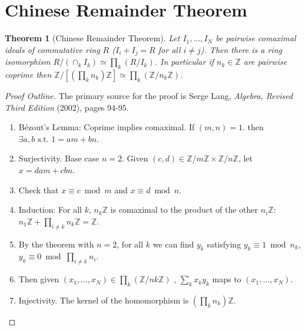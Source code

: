 \documentclass[12pt]{article}
\newtheorem*{theorem}{Theorem}
\begin{document}
\section{Chinese Remainder Theorem}

\begin{theorem}[Chinese Remainder Theorem]
  Let $I_1,\ldots,I_N$ be pairwise comaximal ideals of commutative
  ring $R$ ($I_i+I_j = R$ for all $i\ne j$). Then there is a ring
  isomorphism $R / (\cap_k I_k) \simeq \prod_k (R / I_k)$. In
  particular if $n_k \in \mathbb{Z}$ are pairwise coprime then
  $\mathbb{Z} / [(\prod_k n_k)\mathbb{Z}] \simeq \prod_k (\mathbb{Z} /
  n_k\mathbb{Z})$.
\end{theorem}

\begin{proof}[Proof Outline]
  The primary source for the proof is Serge Lang, \textit{Algebra,
    Revised Third Edition} (2002), pages 94-95.
  \begin{enumerate}
    \item Bézout’s Lemma: Coprime implies comaximal. If $(m,n) = 1$.
      then $\exists a,b \text{ s.t. } 1 = am + bn$.
    \item Surjectivity. Base case $n=2$. Given $(c,d) \in \mathbb{Z} /
      m\mathbb{Z} \times \mathbb{Z} / n\mathbb{Z}$, let $x =dam + cbn$.
    \item Check that $x \equiv c \bmod m$ and $x \equiv d \bmod n$.
    \item Induction: For all $k$, $n_k\mathbb{Z}$ is comaximal to the
      product of the other $n_i\mathbb{Z}$: $n_1\mathbb{Z} + \prod_{i
        \ne k}n_k\mathbb{Z} = \mathbb{Z}$.
    \item By the theorem with $n=2$, for all $k$ we can find $y_k$
      satisfying $y_k \equiv 1 \bmod n_k$, $y_k \equiv 0 \bmod \prod_{i\ne
        k}n_i$.
    \item Then given $(x_1,\ldots,x_N) \in \prod_k (\mathbb{Z} /
      nk\mathbb{Z})$ , $\sum_k x_ky_k$ maps to $(x_1,\ldots,x_N)$.
    \item Injectivity. The kernel of the homomorphism is
      $(\prod_k n_k)\mathbb{Z}$.
  \end{enumerate}
\end{proof}
\end{document}
